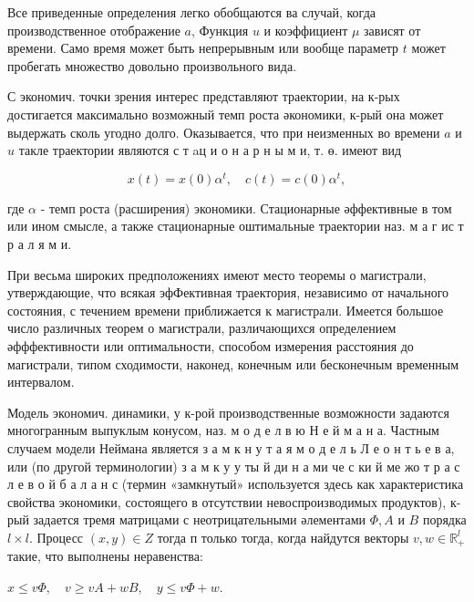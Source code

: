 \documentclass[10pt]{article}
\begin{document}
Все приведенные определения легко обобщаются ва случай, когда производственное отображение $a$, Функция $u$ и коэффициент $\mu$ зависят от времени. Само время может быть непрерывным или вообще параметр $t$ может пробегать множество довольно произвольного вида.



С экономич. точки зрения интерес представляют траектории, на к-рых достигается максимально возможный темп роста әкономики, к-рый она может выдержать сколь угодно долго. Оказывается, что при неизменных во времени $a$ и $u$ такле траектории являются с т aц и о н а р н ы м и, т. ө. имеют вид



\[

x(t)=x(0) \alpha^{t}, \quad c(t)=c(0) \alpha^{t},

\]



где $\alpha$ - темп роста (расширения) экономики. Стационарные әффективные в том или ином смысле, а также стационарные оштимальные траектории наз. м а г ис т р а л я м и.



При весьма широких предположениях имеют место теоремы о магистрали, утверждающие, что всякая эфФективная траектория, независимо от начального состояния, с течением времени приближается к магистрали. Имеется большое число различных теорем о магистрали, различающихся определением әфффективности или оптимальности, способом измерения расстояния до магистрали, типом сходимости, наконед, конечным или бесконечным временным интервалом.



Модель экономич. динамики, у к-рой производственные возможности задаются многогранным выпуклым конусом, наз. м о д е л в ю Н е й м а н а. Частным случаем модели Неймана является з а м к н у т а я м о д е л ь Л е о н т ь е в а, или (по другой терминологии) з а м к у у ты й ди н а ми че с ки й ме жо т р а с л е в о й б а л а н с (термин «замкнутый» используется здесь как характеристика свойства экономики, состоящего в отсутствии невоспроизводимых продуктов), к-рый задается тремя матрицами с неотрицательными әлементами $\Phi, A$ и $B$ порядка $l \times l$. Процесс $(x, y) \in Z$ тогда п только тогда, когда найдутся векторы $v, w \in \mathbb{R}_{+}^{l}$ такие, что выполнены неравенства:



$x \leqslant v \Phi, \quad v \geqslant v A+w B, \quad y \leqslant v \Phi+w$.
\end{document}
